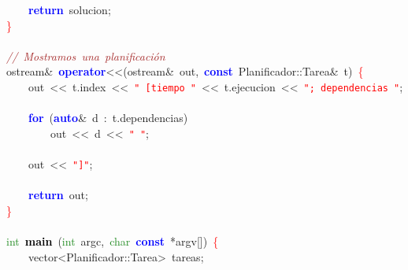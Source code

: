 \mbox{}\ \ \ \ \textbf{\textcolor{Blue}{return}}\ solucion\textcolor{BrickRed}{;} \\
\mbox{}\textcolor{Red}{\}} \\
\mbox{} \\
\mbox{}\textit{\textcolor{Brown}{//\ Mostramos\ una\ planificación}} \\
\mbox{}ostream\textcolor{BrickRed}{\&}\ \textbf{\textcolor{Blue}{operator}}\textcolor{BrickRed}{\textless{}\textless{}(}ostream\textcolor{BrickRed}{\&}\ out\textcolor{BrickRed}{,}\ \textbf{\textcolor{Blue}{const}}\ Planificador\textcolor{BrickRed}{::}Tarea\textcolor{BrickRed}{\&}\ t\textcolor{BrickRed}{)}\ \textcolor{Red}{\{} \\
\mbox{}\ \ \ \ out\ \textcolor{BrickRed}{\textless{}\textless{}}\ t\textcolor{BrickRed}{.}index\ \textcolor{BrickRed}{\textless{}\textless{}}\ \texttt{\textcolor{Red}{"{}\ [tiempo\ "{}}}\ \textcolor{BrickRed}{\textless{}\textless{}}\ t\textcolor{BrickRed}{.}ejecucion\ \textcolor{BrickRed}{\textless{}\textless{}}\ \texttt{\textcolor{Red}{"{};\ dependencias\ "{}}}\textcolor{BrickRed}{;} \\
\mbox{} \\
\mbox{}\ \ \ \ \textbf{\textcolor{Blue}{for}}\ \textcolor{BrickRed}{(}\textbf{\textcolor{Blue}{auto}}\textcolor{BrickRed}{\&}\ d\ \textcolor{BrickRed}{:}\ t\textcolor{BrickRed}{.}dependencias\textcolor{BrickRed}{)} \\
\mbox{}\ \ \ \ \ \ \ \ out\ \textcolor{BrickRed}{\textless{}\textless{}}\ d\ \textcolor{BrickRed}{\textless{}\textless{}}\ \texttt{\textcolor{Red}{"{}\ "{}}}\textcolor{BrickRed}{;} \\
\mbox{} \\
\mbox{}\ \ \ \ out\ \textcolor{BrickRed}{\textless{}\textless{}}\ \texttt{\textcolor{Red}{"{}]"{}}}\textcolor{BrickRed}{;} \\
\mbox{} \\
\mbox{}\ \ \ \ \textbf{\textcolor{Blue}{return}}\ out\textcolor{BrickRed}{;} \\
\mbox{}\textcolor{Red}{\}} \\
\mbox{} \\
\mbox{}\textcolor{ForestGreen}{int}\ \textbf{\textcolor{Black}{main}}\ \textcolor{BrickRed}{(}\textcolor{ForestGreen}{int}\ argc\textcolor{BrickRed}{,}\ \textcolor{ForestGreen}{char}\ \textbf{\textcolor{Blue}{const}}\ \textcolor{BrickRed}{*}argv\textcolor{BrickRed}{[])}\ \textcolor{Red}{\{} \\
\mbox{}\ \ \ \ \textcolor{TealBlue}{vector\textless{}Planificador::Tarea\textgreater{}}\ tareas\textcolor{BrickRed}{;} \\
